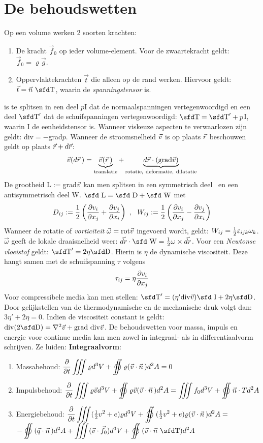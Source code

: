 \documentclass[twoside]{report}
\begin{document}
\section{De behoudswetten}
Op een volume werken 2 soorten krachten:
\begin{enumerate}
\item  De kracht  $\vec{f}_0$ op ieder volume-element. Voor de zwaartekracht
       geldt: $\vec{f}_0=\varrho\vec{g}$.
\item Oppervlaktekrachten $\vec{t}$ die alleen op de rand werken. Hiervoor
      geldt: $\vec{t}=\vec{n}~\TT$, waarin {\TT} de {\it spanningstensor} is.
\end{enumerate}
{\TT} is te splitsen in een deel $p${\sfd I} dat de normaalspanningen
vertegenwoordigd en een deel $\TT'$ dat de schuifspanningen vertegenwoordigd:
$\TT=\TT'+p${\sfd I}, waarin {\sfd I} de eenheidstensor is. Wanneer viskeuze
aspecten te verwaarlozen zijn geldt: div\TT$=-$grad$p$.
\npar
Wanneer de stroomsnelheid $\vec{v}$ is op plaats $\vec{r}$ beschouwen geldt op plaats
$\vec{r}+d\vec{r}$:
\[
\vec{v}(d\vec{r}\,)=
\underbrace{\vec{v}(\vec{r}\,)}_{\rm translatie}+
\underbrace{d\vec{r}\cdot({\rm grad}\vec{v})}_{\rm rotatie,~deformatie,~dilatatie}
\]
De grootheid {\sfd L}$:=$grad$\vec{v}$ kan men splitsen in een symmetrisch deel
\DD~en een antisymmetrisch deel {\sfd W}.
$\mbox{\sfd L}=\mbox{\sfd D}+\mbox{\sfd W}$ met
\[
D_{ij}:=\frac{1}{2}\left(\frac{\partial v_i}{\partial x_j}+\frac{\partial v_j}{\partial x_i}\right)~,~~
W_{ij}:=\frac{1}{2}\left(\frac{\partial v_i}{\partial x_j}-\frac{\partial v_j}{\partial x_i}\right)
\]
Wanneer de rotatie of {\it vorticiteit} $\vec{\omega}={\rm rot}\vec{v}$ ingevoerd
wordt, geldt: $W_{ij}=\mbox{$\frac{1}{2}$}\varepsilon_{ijk}\omega_k$. $\vec{\omega}$ geeft
de lokale draaisnelheid weer: $\vec{dr}\cdot\mbox{\sfd W}=\half\omega\times\vec{dr}$.
\npar
Voor een {\it Newtonse vloeistof} geldt: $\TT'=2\eta\DD$. Hierin is $\eta$ de
dynamische viscositeit. Deze hangt samen met de schuifspanning $\tau$ volgens
\[
\tau_{ij}=\eta\frac{\partial v_i}{\partial x_j}
\]
Voor compressibele media kan men stellen:
$\TT'=(\eta'{\rm div}\vv)\mbox{\sfd I}+2\eta\DD$. Door gelijkstellen van de
thermodynamische en de mechanische druk volgt dan: $3\eta'+2\eta=0$. Indien
de viscositeit constant is geldt: ${\rm div}(2\DD)=\nabla^2\vv+{\rm grad~div}\vv$.
\npar
De behoudswetten voor massa, impuls en energie voor continue media kan men
zowel in integraal- als in differentiaalvorm schrijven. Ze luiden:
\npar
{\large\bf Integraalvorm}:
\begin{enumerate}
\item Massabehoud: $\displaystyle\Q{}{t}\iiint\varrho d^3V+\oiint\varrho(\vv\cdot\vvec{n})d^2A=0$
\item Impulsbehoud: $\displaystyle\Q{}{t}\iiint\varrho\vv d^3V+\oiint\varrho\vv(\vv\cdot\vvec{n})d^2A=\iiint f_0d^3V+\oiint\vec{n}\cdot Td^2A$
\item Energiebehoud: $\displaystyle\Q{}{t}\iiint(\half v^2+e)\varrho d^3V+\oiint(\half v^2+e)\varrho(\vv\cdot\vvec{n})d^2A=$\\[3mm]
\hspace*{35mm}$\displaystyle-\oiint(\vec{q}\cdot\vvec{n})d^2A+\iiint(\vv\cdot\vec{f}_0)d^3V+\oiint(\vv\cdot\vec{n}~\TT)d^2A$
\end{enumerate}
\end{document}
